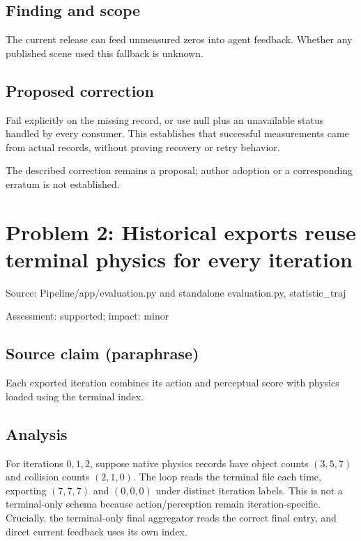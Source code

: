 \documentclass[11pt]{article}
\begin{document}
\subsection*{Finding and scope}

The current release can feed unmeasured zeros into agent feedback. Whether any published scene used this fallback is unknown.

\subsection*{Proposed correction}

Fail explicitly on the missing record, or use null plus an unavailable status handled by every consumer. This establishes that successful measurements came from actual records, without proving recovery or retry behavior.

The described correction remains a proposal; author adoption or a corresponding erratum is not established.

\section*{Problem 2: Historical exports reuse terminal physics for every iteration}

Source: Pipeline/app/evaluation.py and standalone evaluation.py, statistic\_traj

Assessment: supported; impact: minor

\subsection*{Source claim (paraphrase)}

Each exported iteration combines its action and perceptual score with physics loaded using the terminal index.

\subsection*{Analysis}

For iterations \(0,1,2\), suppose native physics records have object counts \((3,5,7)\) and collision counts \((2,1,0)\). The loop reads the terminal file each time, exporting \((7,7,7)\) and \((0,0,0)\) under distinct iteration labels. This is not a terminal-only schema because action/perception remain iteration-specific. Crucially, the terminal-only final aggregator reads the correct final entry, and direct current feedback uses its own index.
\end{document}
